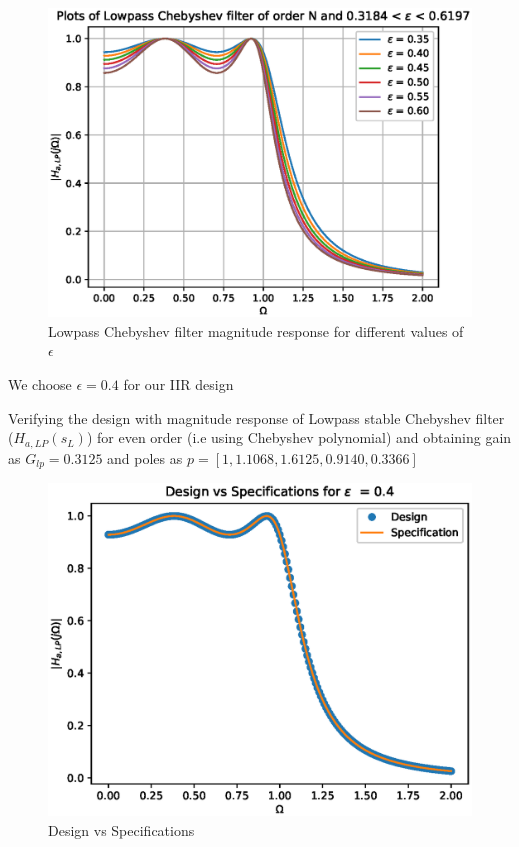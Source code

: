 \documentclass{beamer}
\begin{document}
\begin{frame}
\begin{figure}[!h]
\includegraphics[width=0.75\columnwidth]{./figs_iir/ee18btech11034_parameter_plots.eps}
\caption{Lowpass Chebyshev filter magnitude response for different values of $\epsilon$}
\label{fig:Figure5}
\end{figure}
We choose $\epsilon = 0.4$ for our IIR design
\end{frame}
\begin{frame}
Verifying the design with magnitude response of Lowpass stable Chebyshev filter ($H_{a,LP}(s_L)$) for even order (i.e using Chebyshev polynomial) and obtaining gain as $G_{lp} = 0.3125$ and poles as $p = [1,1.1068,1.6125,0.9140,0.3366]$
\begin{figure}[!h]
\includegraphics[width=0.75\columnwidth]{./figs_iir/ee18btech11034_specifications.eps}
\caption{Design vs Specifications}
\label{fig:Figure6}
\end{figure}

\end{frame}
\end{document}
